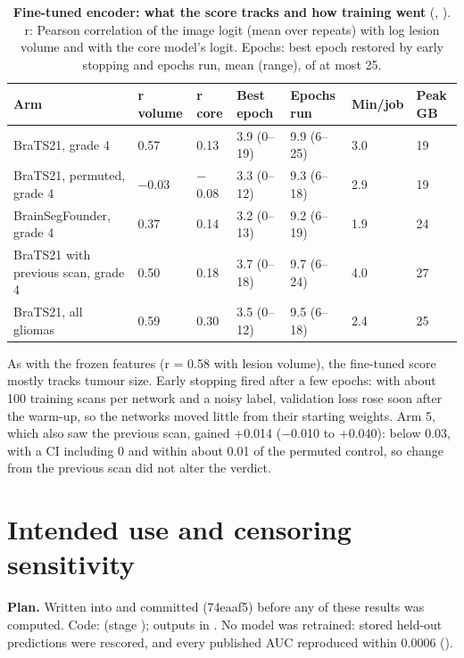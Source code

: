 \documentclass[11pt,a4paper]{article}
\begin{document}
\begin{table}[H]
\centering
\small
\renewcommand{\thetable}{S43}\renewcommand{\theHtable}{S43}
\caption{\textbf{Fine-tuned encoder: what the score tracks and how training went} (,
). r: Pearson correlation of the image logit (mean over repeats) with log lesion volume and with the
core model's logit. Epochs: best epoch restored by early stopping and epochs run, mean (range), of at most 25.}
\label{tab:S43}
\begin{tabularx}{\linewidth}{@{}L R{1.4cm} R{1.4cm} R{1.9cm} R{1.9cm} R{1.2cm} R{1.1cm}@{}}
\toprule
Arm & r volume & r core & Best epoch & Epochs run & Min/job & Peak GB \\
\midrule
BraTS21, grade 4 & 0.57 & 0.13 & 3.9 (0--19) & 9.9 (6--25) & 3.0 & 19 \\
BraTS21, permuted, grade 4 & $-$0.03 & $-$0.08 & 3.3 (0--12) & 9.3 (6--18) & 2.9 & 19 \\
BrainSegFounder, grade 4 & 0.37 & 0.14 & 3.2 (0--13) & 9.2 (6--19) & 1.9 & 24 \\
BraTS21 with previous scan, grade 4 & 0.50 & 0.18 & 3.7 (0--18) & 9.7 (6--24) & 4.0 & 27 \\
BraTS21, all gliomas & 0.59 & 0.30 & 3.5 (0--12) & 9.5 (6--18) & 2.4 & 25 \\
\bottomrule
\end{tabularx}
\end{table}

As with the frozen features (r = 0.58 with lesion volume), the fine-tuned score mostly tracks tumour size. Early
stopping fired after a few epochs: with about 100 training scans per network and a noisy label, validation loss
rose soon after the warm-up, so the networks moved little from their starting weights. Arm 5, which also saw the previous scan, gained +0.014
($-$0.010 to +0.040): below 0.03, with a CI including 0 and within about 0.01 of the permuted control, so change
from the previous scan did not alter the verdict.

\FloatBarrier
\section{Intended use and censoring sensitivity}\label{sec:S23}

\textbf{Plan.} Written into  and committed (74eaaf5) before any of these results
was computed. Code:  (stage ); outputs in
. No model was retrained: stored held-out predictions were rescored,
and every published AUC reproduced within 0.0006 ().
\end{document}
